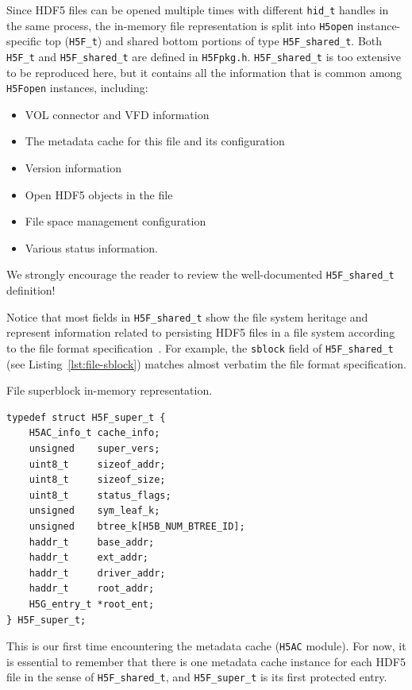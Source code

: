 Since HDF5 files can be opened multiple times with different \texttt{hid\_t} handles in the same process, the in-memory file representation is split into \texttt{H5open} instance-specific top (\texttt{H5F\_t}) and shared bottom portions of type \texttt{H5F\_shared\_t}. Both \texttt{H5F\_t} and \texttt{H5F\_shared\_t} are defined in \texttt{H5Fpkg.h}. \texttt{H5F\_shared\_t} is too extensive to be reproduced here, but it contains all the information that is common among \texttt{H5Fopen} instances, including:

 \begin{itemize}
     \item VOL connector and VFD information
     \item The metadata cache for this file and its configuration
     \item Version information
     \item Open HDF5 objects in the file
     \item File space management configuration
     \item Various status information.
 \end{itemize}
We strongly encourage the reader to review the well-documented \texttt{H5F\_shared\_t} definition!
 
Notice that most fields in \texttt{H5F\_shared\_t} show the file system heritage and represent information related to persisting HDF5 files in a file system according to the file format specification~\cite{ffmt}. For example, the \texttt{sblock} field of \texttt{H5F\_shared\_t} (see Listing~\ref{lst:file-sblock}) matches almost verbatim the file format specification.

\begin{listing}
\centering
\caption{File superblock in-memory representation.}
\label{lst:file-sblock}
\begin{verbatim}
typedef struct H5F_super_t {
    H5AC_info_t cache_info;
    unsigned    super_vers;
    uint8_t     sizeof_addr;
    uint8_t     sizeof_size;
    uint8_t     status_flags;
    unsigned    sym_leaf_k;
    unsigned    btree_k[H5B_NUM_BTREE_ID];
    haddr_t     base_addr;
    haddr_t     ext_addr;
    haddr_t     driver_addr;
    haddr_t     root_addr;
    H5G_entry_t *root_ent;
} H5F_super_t;
\end{verbatim}
\end{listing}

This is our first time encountering the metadata cache (\texttt{H5AC} module). For now, it is essential to remember that there is one metadata cache instance for each HDF5 file in the sense of \texttt{H5F\_shared\_t}, and \texttt{H5F\_super\_t} is its first protected entry.


